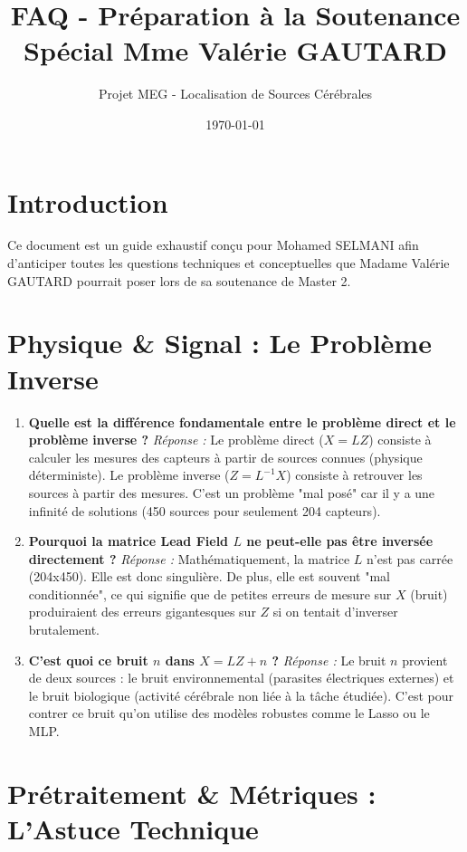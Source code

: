 \documentclass[a4paper,12pt]{article}
\title{\color{MyBlue} \Huge \textbf{FAQ - Préparation à la Soutenance \\ Spécial Mme Valérie GAUTARD}}
\author{Projet MEG - Localisation de Sources Cérébrales}
\date{\today}
\begin{document}
\maketitle

\section*{Introduction}
Ce document est un guide exhaustif conçu pour Mohamed SELMANI afin d'anticiper toutes les questions techniques et conceptuelles que Madame Valérie GAUTARD pourrait poser lors de sa soutenance de Master 2. 

\section{Physique \& Signal : Le Problème Inverse}

\begin{enumerate}[label=\textbf{Q\arabic* :}, leftmargin=1.5cm]
    \item \textbf{Quelle est la différence fondamentale entre le problème direct et le problème inverse ?}
    \textit{Réponse :} Le problème direct (\(X=LZ\)) consiste à calculer les mesures des capteurs à partir de sources connues (physique déterministe). Le problème inverse (\(Z=L^{-1}X\)) consiste à retrouver les sources à partir des mesures. C'est un problème "mal posé" car il y a une infinité de solutions (450 sources pour seulement 204 capteurs).
    
    \item \textbf{Pourquoi la matrice Lead Field \(L\) ne peut-elle pas être inversée directement ?}
    \textit{Réponse :} Mathématiquement, la matrice \(L\) n'est pas carrée (204x450). Elle est donc singulière. De plus, elle est souvent "mal conditionnée", ce qui signifie que de petites erreurs de mesure sur \(X\) (bruit) produiraient des erreurs gigantesques sur \(Z\) si on tentait d'inverser brutalement.

    \item \textbf{C'est quoi ce bruit \(n\) dans \(X = LZ + n\) ?}
    \textit{Réponse :} Le bruit \(n\) provient de deux sources : le bruit environnemental (parasites électriques externes) et le bruit biologique (activité cérébrale non liée à la tâche étudiée). C'est pour contrer ce bruit qu'on utilise des modèles robustes comme le Lasso ou le MLP.
\end{enumerate}

\section{Prétraitement \& Métriques : L'Astuce Technique}
\end{document}
